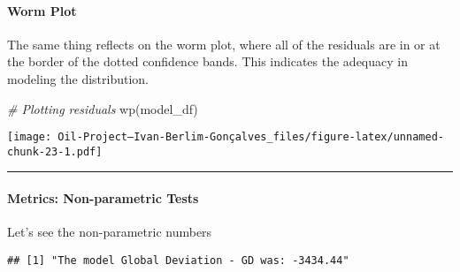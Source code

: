 \documentclass[
]{article}
\newenvironment{Shaded}{\begin{snugshade}}{\end{snugshade}}
\newcommand{\CommentTok}[1]{\textcolor[rgb]{0.56,0.35,0.01}{\textit{#1}}}
\newcommand{\DecValTok}[1]{\textcolor[rgb]{0.00,0.00,0.81}{#1}}
\newcommand{\FunctionTok}[1]{\textcolor[rgb]{0.00,0.00,0.00}{#1}}
\newcommand{\NormalTok}[1]{#1}
\newcommand{\OtherTok}[1]{\textcolor[rgb]{0.56,0.35,0.01}{#1}}
\newcommand{\SpecialCharTok}[1]{\textcolor[rgb]{0.00,0.00,0.00}{#1}}
\newcommand{\StringTok}[1]{\textcolor[rgb]{0.31,0.60,0.02}{#1}}
\begin{document}
\hypertarget{worm-plot}{%
\paragraph{Worm Plot}\label{worm-plot}}

The same thing reflects on the worm plot, where all of the residuals are
in or at the border of the dotted confidence bands. This indicates the
adequacy in modeling the distribution.

\begin{Shaded}
\begin{Highlighting}[]
\CommentTok{\# Plotting residuals}
\FunctionTok{wp}\NormalTok{(model\_df)}
\end{Highlighting}
\end{Shaded}

\texttt{[image: Oil-Project---Ivan-Berlim-Gonçalves\_files/figure-latex/unnamed-chunk-23-1.pdf]}

\begin{center}\rule{0.5\linewidth}{0.5pt}\end{center}

\hypertarget{metrics-non-parametric-tests}{%
\paragraph{Metrics: Non-parametric
Tests}\label{metrics-non-parametric-tests}}

Let's see the non-parametric numbers

\begin{Shaded}
\end{Shaded}

\begin{verbatim}
## [1] "The model Global Deviation - GD was: -3434.44"
\end{verbatim}
\end{document}

